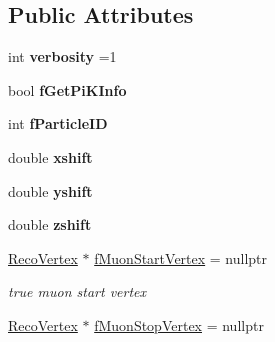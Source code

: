 \subsection*{Public Attributes}
\begin{DoxyCompactItemize}
\item 
\hypertarget{classMCRecoEventLoader_a42b09a53c17f03a6e4fcce20cd4c56b1}{int {\bfseries verbosity} =1}\label{classMCRecoEventLoader_a42b09a53c17f03a6e4fcce20cd4c56b1}

\item 
\hypertarget{classMCRecoEventLoader_a0d3eb072ae7301282ba510bbd11ffb0d}{bool {\bfseries f\-Get\-Pi\-K\-Info}}\label{classMCRecoEventLoader_a0d3eb072ae7301282ba510bbd11ffb0d}

\item 
\hypertarget{classMCRecoEventLoader_ab936432f202a835b7877dbc63303a57c}{int {\bfseries f\-Particle\-I\-D}}\label{classMCRecoEventLoader_ab936432f202a835b7877dbc63303a57c}

\item 
\hypertarget{classMCRecoEventLoader_aefded74813d943854628aa0da13953ff}{double {\bfseries xshift}}\label{classMCRecoEventLoader_aefded74813d943854628aa0da13953ff}

\item 
\hypertarget{classMCRecoEventLoader_a008cd13186e5458c4232376980ff8430}{double {\bfseries yshift}}\label{classMCRecoEventLoader_a008cd13186e5458c4232376980ff8430}

\item 
\hypertarget{classMCRecoEventLoader_a5320937dd08d67c172b0f90956615e11}{double {\bfseries zshift}}\label{classMCRecoEventLoader_a5320937dd08d67c172b0f90956615e11}

\item 
\hypertarget{classMCRecoEventLoader_a06c8c257c06cca00a6b34c51365e6d69}{\hyperlink{classRecoVertex}{Reco\-Vertex} $\ast$ \hyperlink{classMCRecoEventLoader_a06c8c257c06cca00a6b34c51365e6d69}{f\-Muon\-Start\-Vertex} = nullptr}\label{classMCRecoEventLoader_a06c8c257c06cca00a6b34c51365e6d69}

\begin{DoxyCompactList}\small\item\em true muon start vertex \end{DoxyCompactList}\item 
\hypertarget{classMCRecoEventLoader_ab4eb6938d73f33b4d4fbcaccd28f9c65}{\hyperlink{classRecoVertex}{Reco\-Vertex} $\ast$ \hyperlink{classMCRecoEventLoader_ab4eb6938d73f33b4d4fbcaccd28f9c65}{f\-Muon\-Stop\-Vertex} = nullptr}\label{classMCRecoEventLoader_ab4eb6938d73f33b4d4fbcaccd28f9c65}


\end{DoxyCompactItemize}
